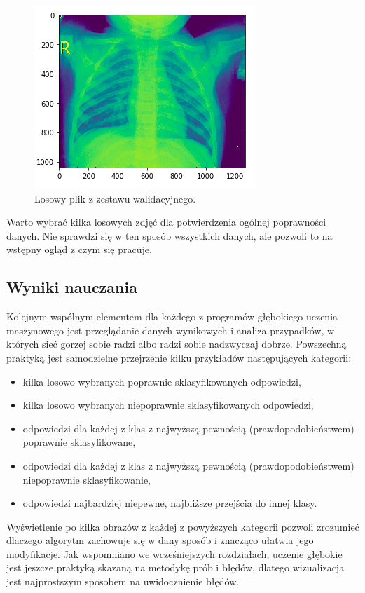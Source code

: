 \documentclass[12pt,a4paper,twoside,titlepage,openright]{book}
\begin{document}
\begin{itemize}
\begin{figure}[ht]
	\centering
			\includegraphics[resolution=100, scale=0.7]{ExampleLungImage.png}
		\caption{Losowy plik z zestawu walidacyjnego.}
\end{figure}

Warto wybrać kilka losowych zdjęć dla potwierdzenia ogólnej poprawności danych. Nie sprawdzi się w ten sposób wszystkich danych, ale pozwoli to na wstępny ogląd z czym się pracuje.

\subsection{Wyniki nauczania}
Kolejnym wspólnym elementem dla każdego z programów głębokiego uczenia maszynowego jest przeglądanie danych wynikowych i analiza przypadków, w których sieć gorzej sobie radzi albo radzi sobie nadzwyczaj dobrze. Powszechną praktyką jest samodzielne przejrzenie kilku przykładów następujących kategorii:
\begin{itemize}
\item kilka losowo wybranych poprawnie sklasyfikowanych odpowiedzi,
\item kilka losowo wybranych niepoprawnie sklasyfikowanych odpowiedzi,
\item odpowiedzi dla każdej z klas z najwyższą pewnością (prawdopodobieństwem) poprawnie sklasyfikowane,
\item odpowiedzi dla każdej z klas z najwyższą pewnością (prawdopodobieństwem) niepoprawnie sklasyfikowanie,
\item odpowiedzi najbardziej niepewne, najbliższe przejścia do innej klasy.
\end{itemize}
Wyświetlenie po kilka obrazów z każdej z powyższych kategorii pozwoli zrozumieć dlaczego algorytm zachowuje się w dany sposób i znacząco ułatwia jego modyfikacje. Jak wspomniano we wcześniejszych rozdziałach, uczenie głębokie jest jeszcze praktyką skazaną na metodykę prób i błędów, dlatego wizualizacja jest najprostszym sposobem na uwidocznienie błędów.


\end{itemize}
\end{document}
